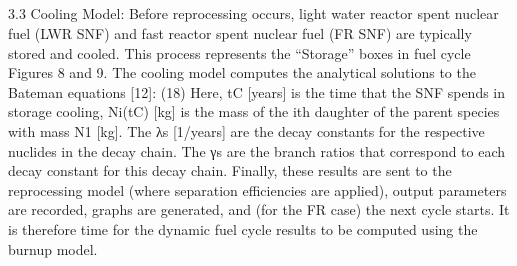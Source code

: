 \subsection{}
\label{1g_sec:}
3.3 Cooling Model:
Before reprocessing occurs, light water reactor spent nuclear fuel (LWR SNF) and fast reactor spent nuclear fuel (FR SNF) are typically stored and cooled.  This process represents the “Storage” boxes in fuel cycle Figures 8 and 9.  The cooling model computes the analytical solutions to the Bateman equations [12]: 
        (18)
Here, tC [years] is the time that the SNF spends in storage cooling,  Ni(tC) [kg] is the mass of the ith daughter of the parent species with mass N1 [kg]. The λs [1/years] are the decay constants for the respective nuclides in the decay chain.   The γs are the branch ratios that correspond to each decay constant for this decay chain.  
Finally, these results are sent to the reprocessing model (where separation efficiencies are applied), output parameters are recorded, graphs are generated, and (for the FR case) the next cycle starts.   It is therefore time for the dynamic fuel cycle results to be computed using the burnup model.




